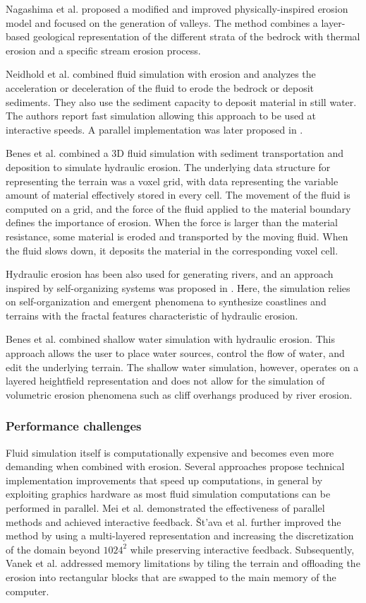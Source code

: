 \documentclass{article}
\begin{document}
Nagashima et al. \cite{Nag98} proposed a modified and improved physically-inspired erosion model and focused on the generation of valleys. The method combines a layer-based geological representation of the different strata of the bedrock with thermal erosion and a specific stream erosion process.

Neidhold et al. \cite{NWD05} combined fluid simulation with erosion and analyzes the acceleration or deceleration of the fluid to erode the bedrock or deposit sediments. They also use the sediment capacity \cite{MKM89} to deposit material in still water. The authors report fast simulation allowing this approach to be used at interactive speeds. A parallel implementation was later proposed in \cite{ASA07}.

Benes et al. \cite{BTHB06} combined a 3D fluid simulation with sediment transportation and deposition to simulate hydraulic erosion. The underlying data structure for representing the terrain was a voxel grid, with data representing the variable amount of material effectively stored in every cell. The movement of the fluid is computed on a grid, and the force of the fluid applied to the material boundary defines the importance of erosion. When the force is larger than the material resistance, some material is eroded and transported by the moving fluid. When the fluid slows down, it deposits the material in the corresponding voxel cell.

Hydraulic erosion has been also used for generating rivers, and an approach inspired by self-organizing systems was proposed in \cite{PM13}. Here, the simulation relies on self-organization and emergent phenomena to synthesize coastlines and terrains with the fractal features characteristic of hydraulic erosion.

Benes et al. \cite{BFO07} combined shallow water simulation with hydraulic erosion. This approach allows the user to place water sources, control the flow of water, and edit the underlying terrain. The shallow water simulation, however, operates on a layered heightfield representation and does not allow for the simulation of volumetric erosion phenomena such as cliff overhangs produced by river erosion.

\subsubsection{Performance challenges}

Fluid simulation itself is computationally expensive and becomes even more demanding when combined with erosion. Several approaches propose technical implementation improvements that speed up computations, in general by exploiting graphics hardware as most fluid simulation computations can be performed in parallel. Mei et al. \cite{MDH07} demonstrated the effectiveness of parallel methods and achieved interactive feedback. Št’ava et al. \cite{ŠBBK08} further improved the method by using a multi-layered representation and increasing the discretization of the domain beyond $1024^2$ while preserving interactive feedback. Subsequently, Vanek et al. \cite{VBHŠ11} addressed memory limitations by tiling the terrain and offloading the erosion into rectangular blocks that are swapped to the main memory of the computer.
\end{document}
